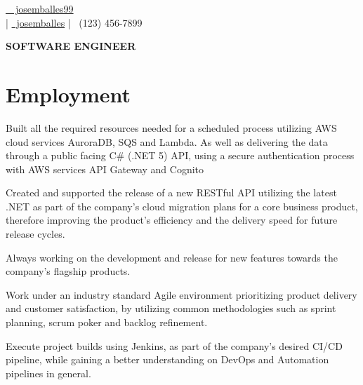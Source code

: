 \documentclass[]{deedy-resume}
\begin{document}
%
%
\lastupdated

%
%


{\href{https://github.com/josemballes99}{\faGithubSquare\ \, josemballes99} \\
\href{mailto: test@test.com}  | \href{https://www.linkedin.com/in/josemballes/}{\faLinkedinSquare \, josemballes}  | {\faMobile \, (123) 456-7899} 
}


\begin{center}
\huge\color{subheadings}\bf{SOFTWARE ENGINEER}
\end{center}

\section{Employment}

\vspace{\topsep} %
\begin{tightemize}
\item Built all the required resources needed for a scheduled process utilizing AWS cloud services AuroraDB, SQS and Lambda. As well as delivering the data through a public facing C\# (.NET 5) API,  using a secure authentication process with AWS services API Gateway and Cognito
\item Created and supported the release of a new RESTful API utilizing the latest .NET as part of the company's cloud migration plans for a core business product, therefore improving the product's efficiency and the delivery speed for future release cycles.
\item Always working on the development and release for new features towards the company's flagship products.
\item Work under an industry standard Agile environment prioritizing product delivery and customer satisfaction, by utilizing common methodologies such as sprint planning, scrum poker and backlog refinement.
\item Execute project builds using Jenkins, as part of the company's desired CI/CD pipeline, while gaining a better understanding on DevOps and Automation pipelines in general. 
\end{tightemize}
\sectionsep
\end{document}
